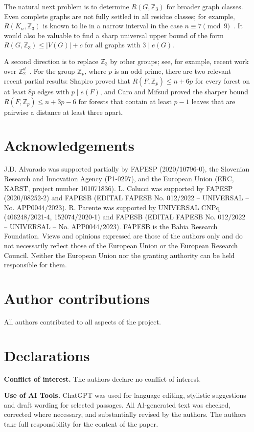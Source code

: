 \documentclass[11pt]{article}
\newcommand{\Z}{\mathbb Z}
\begin{document}
The natural next problem is to determine $R(G,\Z_3)$ for broader graph classes.  Even complete graphs are not fully settled in all residue classes; for example, $R(K_n,\Z_3)$ is known to lie in a narrow interval in the case $n\equiv7\pmod9$~\cite{caro1997binomial}.  It would also be valuable to find a sharp universal upper bound of the form $R(G,\Z_3)\le |V(G)|+c$ for all graphs with $3\mid e(G)$.

A second direction is to replace $\Z_3$ by other groups; see, for example, recent work over $\Z_2^d$~\cite{alvarado2022zero}.  For the group $\Z_p$, where $p$ is an odd prime, there are two relevant recent partial results: Shapiro \cite{shapiro2026linear} proved that $R(F,\Z_p) \leq n+6p$ for every forest on at least $8p$ edges with $p\mid e(F)$, and Caro and Mifsud \cite{caro2025zero} proved the sharper bound $R(F,\Z_p) \leq n+3p-6$ for forests that contain at least $p-1$ leaves that are pairwise a distance at least three apart. 

\section*{Acknowledgements}
J.D. Alvarado was supported partially by FAPESP (2020/10796-0), the Slovenian Research and Innovation Agency (P1-0297), and the European Union (ERC, KARST, project number 101071836).  L. Colucci was supported by FAPESP (2020/08252-2) and FAPESB (EDITAL FAPESB No. 012/2022 -- UNIVERSAL -- No. APP0044/2023).  R. Parente was supported by UNIVERSAL CNPq (406248/2021-4, 152074/2020-1) and FAPESB (EDITAL FAPESB No. 012/2022 -- UNIVERSAL -- No. APP0044/2023).  FAPESB is the Bahia Research Foundation.  Views and opinions expressed are those of the authors only and do not necessarily reflect those of the European Union or the European Research Council.  Neither the European Union nor the granting authority can be held responsible for them.

\section*{Author contributions}
All authors contributed to all aspects of the project.

\section*{Declarations}
\textbf{Conflict of interest.} The authors declare no conflict of interest.

\medskip

\noindent \textbf{Use of AI Tools.} ChatGPT was used for language editing, stylistic suggestions and draft wording for selected passages. All AI-generated text was checked, corrected where necessary, and substantially revised by the authors. The authors take full responsibility for the content of the paper.



\end{document}
